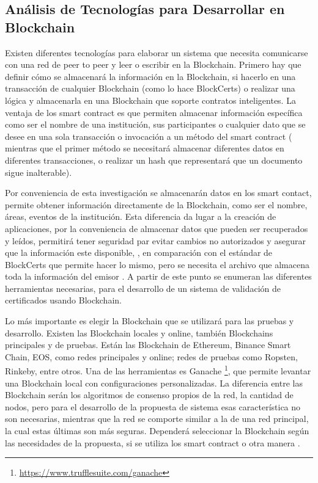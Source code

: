 \subsection{ Análisis de Tecnologías para Desarrollar en Blockchain}

Existen diferentes tecnologías para elaborar un sistema que necesita comunicarse con una red de peer to peer y leer o escribir en la Blockchain.
Primero hay que definir cómo se almacenará la información en la Blockchain, si hacerlo en una transacción de cualquier  Blockchain (como lo hace
BlockCerts) o realizar una lógica y almacenarla en una  Blockchain que soporte contratos inteligentes.
La ventaja de los smart contract es que permiten almacenar información específica como ser el nombre de una institución, sus participantes o
cualquier dato que se desee en una sola transacción o invocación a un método del smart contract ( mientras que el primer método se necesitará 
almacenar diferentes datos en diferentes transacciones, o realizar un hash que representará que un documento sigue inalterable).



Por conveniencia de esta investigación se almacenarán datos en los smart contact, permite obtener información directamente de 
la  Blockchain, como ser el nombre, áreas, eventos de la institución. Esta diferencia da lugar a la creación de aplicaciones, por la 
conveniencia de almacenar datos que pueden ser recuperados y leídos, permitirá tener seguridad par evitar cambios no autorizados y asegurar que la información este disponible,
, en comparación con el estándar de BlockCerts que permite hacer lo mismo, pero se necesita el archivo que almacena toda la información del emisor \cite[]{opencerts_gestion_nodate,blockcerts_introduction_nodate}.
A partir de este punto se enumeran las diferentes herramientas necesarias, para el desarrollo de un sistema de validación de certificados usando Blockchain.


Lo más importante es elegir la  Blockchain que se utilizará para las pruebas y desarrollo. Existen 
las  Blockchain locales y online, también Blockchains principales y de pruebas.
Están las  Blockchain de Ethereum, Binance Smart Chain, EOS, como redes principales y online; redes de pruebas como
Ropsten, Rinkeby, entre otros.  Una de las herramientas es Ganache \footnote{\url{https://www.trufflesuite.com/ganache}}, que permite
levantar una  Blockchain  local con configuraciones personalizadas.
La diferencia entre las  Blockchain serán los algoritmos de consenso propios de la red, la cantidad de nodos, pero 
para el desarrollo de la propuesta de sistema esas característica no son necesarias, mientras que la red se comporte similar a la de una red principal, la
cual estas últimas son más seguras.
Dependerá seleccionar la  Blockchain según las necesidades de la propuesta, si se utiliza los smart contract o otra manera \cite[]{truffle_suite_ganache_nodate}.

